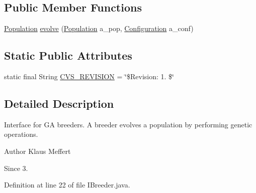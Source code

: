 \subsection*{Public Member Functions}
\begin{DoxyCompactItemize}
\item 
\hyperlink{classorg_1_1jgap_1_1_population}{Population} \hyperlink{interfaceorg_1_1jgap_1_1_i_breeder_a3acfba66e149a2de2d9496fe11530fe7}{evolve} (\hyperlink{classorg_1_1jgap_1_1_population}{Population} a\-\_\-pop, \hyperlink{classorg_1_1jgap_1_1_configuration}{Configuration} a\-\_\-conf)
\end{DoxyCompactItemize}
\subsection*{Static Public Attributes}
\begin{DoxyCompactItemize}
\item 
static final String \hyperlink{interfaceorg_1_1jgap_1_1_i_breeder_acb61f1377521b2c3934f96c80b1ca70f}{C\-V\-S\-\_\-\-R\-E\-V\-I\-S\-I\-O\-N} = \char`\"{}\$Revision\-: 1. \$\char`\"{}
\end{DoxyCompactItemize}


\subsection{Detailed Description}
Interface for G\-A breeders. A breeder evolves a population by performing genetic operations.

\begin{DoxyAuthor}{Author}
Klaus Meffert 
\end{DoxyAuthor}
\begin{DoxySince}{Since}
3. 
\end{DoxySince}


Definition at line 22 of file I\-Breeder.\-java.



